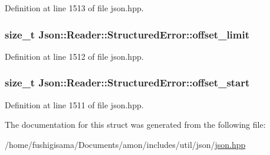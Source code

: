 Definition at line 1513 of file json.\-hpp.

\hypertarget{struct_json_1_1_reader_1_1_structured_error_a80747dae744bcc80a9bc81c94fd42e13}{
\subsubsection[{offset\-\_\-limit}]{\setlength{\rightskip}{0pt plus 5cm}size\-\_\-t Json\-::\-Reader\-::\-Structured\-Error\-::offset\-\_\-limit}}\label{struct_json_1_1_reader_1_1_structured_error_a80747dae744bcc80a9bc81c94fd42e13}


Definition at line 1512 of file json.\-hpp.

\hypertarget{struct_json_1_1_reader_1_1_structured_error_a160dae4eb3464a2209b743c755baf65f}{
\subsubsection[{offset\-\_\-start}]{\setlength{\rightskip}{0pt plus 5cm}size\-\_\-t Json\-::\-Reader\-::\-Structured\-Error\-::offset\-\_\-start}}\label{struct_json_1_1_reader_1_1_structured_error_a160dae4eb3464a2209b743c755baf65f}


Definition at line 1511 of file json.\-hpp.



The documentation for this struct was generated from the following file\-:\begin{DoxyCompactItemize}
\item 
/home/fushigisama/\-Documents/amon/includes/util/json/\hyperlink{json_8hpp}{json.\-hpp}\end{DoxyCompactItemize}
